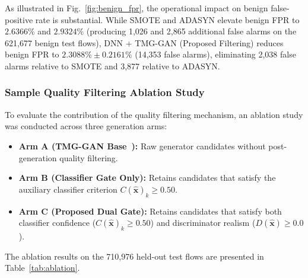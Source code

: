 \documentclass[conference]{IEEEtran}
\begin{document}
As illustrated in Fig.~\ref{fig:benign_fpr}, the operational impact on benign false-positive rate is substantial. While SMOTE and ADASYN elevate benign FPR to $2.6366\%$ and $2.9324\%$ (producing 1,026 and 2,865 additional false alarms on the 621,677 benign test flows), DNN + TMG-GAN (Proposed Filtering) reduces benign FPR to $\mathbf{2.3088\% \pm 0.2161\%}$ (14,353 false alarms), eliminating 2,038 false alarms relative to SMOTE and 3,877 relative to ADASYN.

\subsubsection{Sample Quality Filtering Ablation Study}

To evaluate the contribution of the quality filtering mechanism, an ablation study was conducted across three generation arms:
\begin{itemize}\setlength{\itemsep}{2pt}\setlength{\topsep}{2pt}\setlength{\parsep}{0pt}
    \item \textbf{Arm A (TMG-GAN Base~\cite{ding2024tmggan}):} Raw generator candidates without post-generation quality filtering.
    \item \textbf{Arm B (Classifier Gate Only):} Retains candidates that satisfy the auxiliary classifier criterion $C(\hat{\mathbf{x}})_k \geq 0.50$.
    \item \textbf{Arm C (\textbf{Proposed Dual Gate}):} Retains candidates that satisfy both classifier confidence ($C(\hat{\mathbf{x}})_k \geq 0.50$) and discriminator realism ($D(\hat{\mathbf{x}}) \geq 0.0$).
\end{itemize}

The ablation results on the 710,976 held-out test flows are presented in Table~\ref{tab:ablation}.

\begin{table}[t]
\centering
\caption{Ablation Study of Sample Quality Filtering on Held-Out Test Set (Mean $\pm$ Std across 3 Seeds)}
\label{tab:ablation}
\end{table}
\end{document}
